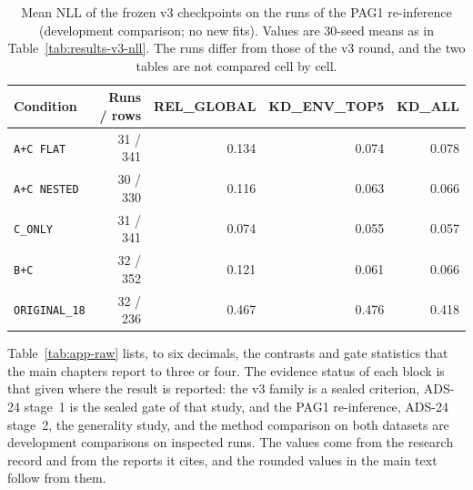 \begin{table}[htbp]
\centering
\caption[Mean NLL of the frozen v3 checkpoints on the PAG1 runs]{Mean NLL of the frozen v3 checkpoints on the runs of the
PAG1 re-inference (development comparison; no new fits). Values are 30-seed
means as in Table~\ref{tab:results-v3-nll}. The runs differ from those
of the v3 round, and the two tables are not compared cell by cell.}
\label{tab:results-pag1}
\small
\begin{tabular}{@{}lrrrr@{}}
\toprule
Condition & Runs / rows & REL\_GLOBAL & KD\_ENV\_TOP5 & KD\_ALL \\
\midrule
\texttt{A+C FLAT}     & 31 / 341 & 0.134 & 0.074 & 0.078 \\
\texttt{A+C NESTED}   & 30 / 330 & 0.116 & 0.063 & 0.066 \\
\texttt{C\_ONLY}      & 31 / 341 & 0.074 & 0.055 & 0.057 \\
\texttt{B+C}          & 32 / 352 & 0.121 & 0.061 & 0.066 \\
\texttt{ORIGINAL\_18} & 32 / 236 & 0.467 & 0.476 & 0.418 \\
\bottomrule
\end{tabular}
\end{table}

Table~\ref{tab:app-raw} lists, to six decimals, the contrasts and gate
statistics that the main chapters report to three or four. The evidence
status of each block is that given where the result is reported: the v3
family is a sealed criterion, ADS-24 stage~1 is the sealed gate of that
study, and the PAG1 re-inference, ADS-24 stage~2, the generality study,
and the method comparison on both datasets are development
comparisons on inspected runs. The values come from the
research record and from the reports it cites, and the rounded values
in the main text follow from them.

